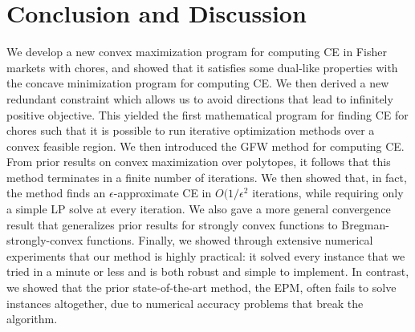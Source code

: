 \documentclass[format=acmsmall,authorversion]{acmart}
\newcommand{\ck}[1]{{\textcolor{red}{CK: #1}}}
\begin{document}







\section{Conclusion and Discussion}
We develop a new convex maximization program for computing CE in Fisher markets with chores, and showed that it satisfies some dual-like properties with the concave minimization program for computing CE.
We then derived a new redundant constraint which allows us to avoid directions that lead to infinitely positive objective. This yielded the first mathematical program for finding CE for chores such that it is possible to run iterative optimization methods over a convex feasible region.
We then introduced the GFW method for computing CE. From prior results on convex maximization over polytopes, it follows that this method terminates in a finite number of iterations. We then showed that, in fact, the method finds an $\epsilon$-approximate CE in $O(1/\epsilon^2$ iterations, while requiring only a simple LP solve at every iteration. We also gave a more general convergence result that generalizes prior results for strongly convex functions to Bregman-strongly-convex functions.
Finally, we showed through extensive numerical experiments that our method is highly practical: it solved every instance that we tried in a minute or less and is both robust and simple to implement. In contrast, we showed that the prior state-of-the-art method, the EPM, often fails to solve instances altogether, due to numerical accuracy problems that break the algorithm. 
\end{document}
